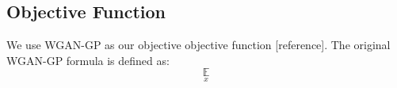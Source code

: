 \subsection{Objective Function}
We use WGAN-GP as our objective objective function [reference]. The original WGAN-GP formula is defined as:
\begin{equation}
\underset{x}{\mathbb{E}}
\end{equation}